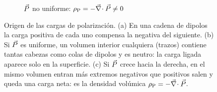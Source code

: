 \begin{figure}[t]
\begin{subfigure}[b]{0.48\textwidth}
\caption{$\vec P$ no uniforme: $\rho_{\mathrm P}=-\vec\nabla\!\cdot\vec P\neq0$}
\end{subfigure}
\caption{Origen de las cargas de polarización. (a) En una cadena de dipolos la carga positiva de cada
uno compensa la negativa del siguiente. (b) Si $\vec P$ es uniforme, un volumen interior cualquiera (trazos)
contiene tantas cabezas como colas de dipolos y es neutro: la carga ligada aparece solo en la superficie.
(c) Si $\vec P$ crece hacia la derecha, en el mismo volumen entran más extremos negativos que positivos
salen y queda una carga neta: es la densidad volúmica $\rho_{\mathrm P}=-\vec\nabla\!\cdot\vec P$.}
\label{fig:cadena}
\end{figure}
